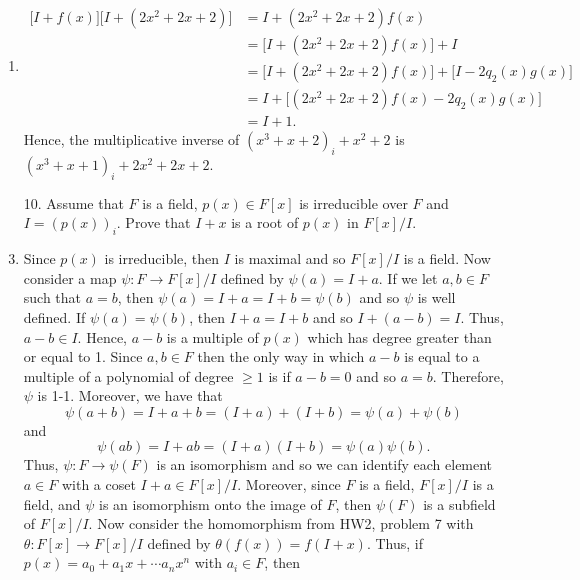 \documentclass[12pt]{article}
\makeatletter
\theoremstyle{definition}
\theoremstyle{remark}
\renewenvironment{proof}[1][\proofname]{\par
  \pushQED{\qed}%
  \normalfont \topsep6\p@\@plus6\p@\relax
  \list{}{\leftmargin=0mm
          \rightmargin=4mm
          \settowidth{\itemindent}{\itshape#1}%
          \labelwidth=\itemindent
          \parsep=0pt \listparindent=\parindent 
  }
  \item[\hskip\labelsep
        \itshape
    #1\@addpunct{.}]\ignorespaces
}{%
  \popQED\endlist\@endpefalse
}
\newenvironment{solution}[1][\bf{\textit{Solution}}]{\par
  
  \normalfont \topsep6\p@\@plus6\p@\relax
  \list{}{\leftmargin=0mm
          \rightmargin=4mm
          \settowidth{\itemindent}{\itshape#1}%
          \labelwidth=\itemindent
          \parsep=0pt \listparindent=\parindent 
  }
  \item[\hskip\labelsep
        \itshape
    #1\@addpunct{.}]\ignorespaces
}{%
  \popQED\endlist\@endpefalse
}
\let\oldproofname=\proofname
\renewcommand{\proofname}{\bf{\textit{\oldproofname}}}
\makeatother
\begin{document}
\begin{enumerate}[leftmargin=*]
\begin{solution}
                    \begin{equation*}
                        \begin{split}
                            \big[I+f(x)\big]\big[I+(2x^2+2x+2)\big] &= I+(2x^2+2x+2)f(x) \\
                            &= \big[I+(2x^2+2x+2)f(x)\big]+I \\
                            &= \big[I+(2x^2+2x+2)f(x)\big]+\big[I-2q_2(x)g(x)\big] \\
                            &= I+\big[(2x^2+2x+2)f(x)-2q_2(x)g(x)\big] \\
                            &= I+1.
                        \end{split}
                    \end{equation*}
                Hence, the multiplicative inverse of $(x^3+x+2)_i+x^2+2$ is $(x^3+x+1)_i+2x^2+2x+2$.
            \end{solution}
        \item[10.] Assume that $F$ is a field, $p(x)\in F[x]$ is irreducible over $F$ and $I=(p(x))_i$. Prove that $I+x$ is a root of $p(x)$ in $F[x]/I$.
            \begin{proof}
                Since $p(x)$ is irreducible, then $I$ is maximal and so $F[x]/I$ is a field. Now consider a map $\psi\colon F\rightarrow F[x]/I$ defined by $\psi(a)=I+a$. If we let $a,b\in F$ such that $a=b$, then $\psi(a)=I+a=I+b=\psi(b)$ and so $\psi$ is well defined. If $\psi(a)=\psi(b)$, then $I+a=I+b$ and so $I+(a-b)=I$. Thus, $a-b\in I$. Hence, $a-b$ is a multiple of $p(x)$ which has degree greater than or equal to 1. Since $a,b\in F$ then the only way in which $a-b$ is equal to a multiple of a polynomial of degree $\geq 1$ is if $a-b=0$ and so $a=b$. Therefore, $\psi$ is 1-1. Moreover, we have that 
                    \begin{equation*}
                        \psi(a+b)=I+a+b=(I+a)+(I+b)=\psi(a)+\psi(b)
                    \end{equation*}
                \noindent and
                    \begin{equation*}
                        \psi(ab)=I+ab=(I+a)(I+b)=\psi(a)\psi(b).
                    \end{equation*}
                Thus, $\psi\colon F\rightarrow \psi(F)$ is an isomorphism and so we can identify each element $a\in F$ with a coset $I+a\in F[x]/I$. Moreover, since $F$ is a field, $F[x]/I$ is a field, and $\psi$ is an isomorphism onto the image of $F$, then $\psi(F)$ is a subfield of $F[x]/I$. Now consider the homomorphism from HW2, problem 7 with $\theta\colon F[x]\rightarrow F[x]/I$ defined by $\theta(f(x))=f(I+x)$. Thus, if $p(x)=a_0+a_1x+\cdots a_nx^n$ with $a_i\in F$, then 

\end{proof}
\end{enumerate}
\end{document}
